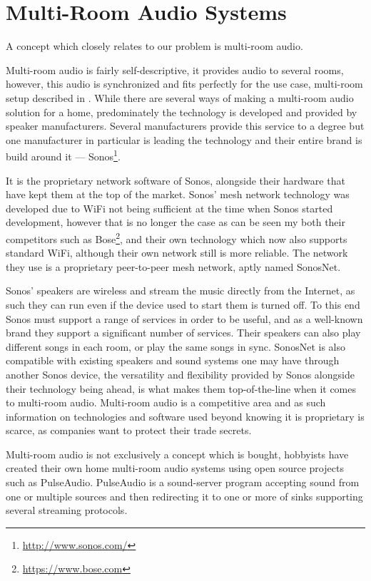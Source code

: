 \section{Multi-Room Audio Systems}
A concept which closely relates to our problem is multi-room audio.

Multi-room audio is fairly self-descriptive, it provides audio to several rooms, however, this audio is synchronized and fits perfectly for the use case, multi-room setup described in .
While there are several ways of making a multi-room audio solution for a home, predominately the technology is developed and provided by speaker manufacturers.
Several manufacturers provide this service to a degree but one
manufacturer in particular is leading the technology and their entire brand is build around it --- Sonos\footnote{\url{http://www.sonos.com/}}.

It is the proprietary network software of Sonos, alongside their hardware that have kept them at the top of the market.
Sonos' mesh network technology was developed due to WiFi not being sufficient
at the time when Sonos started development, however that is no longer the case as can be seen my both their competitors such as Bose\footnote{\url{https://www.bose.com}}, and their own technology which now also supports standard WiFi, although their own network still is more reliable.\cite{sonos1}
The network they use is a proprietary peer-to-peer mesh network, aptly named SonosNet.\cite{sonosWiki}

Sonos' speakers are wireless and stream the music directly from the Internet, as such they can run even if the device used to start them is turned off.
To this end Sonos must support a range of services in order to be useful, and as a well-known brand they support a significant number of services.
Their speakers can also play different songs in each room, or play the same songs in sync.
SonosNet is also compatible with existing speakers and sound systems one may have through another Sonos device, the versatility and flexibility provided by Sonos alongside their technology being ahead, is what makes them top-of-the-line when it comes to multi-room audio.\cite{sonos2}
Multi-room audio is a competitive area and as such information on technologies and software used beyond knowing it is proprietary is scarce, as companies want to protect their trade secrets.

Multi-room audio is not exclusively a concept which is bought, hobbyists have created their own home multi-room audio systems using open source projects such as PulseAudio.\cite{pulseAudioHobbyist}
PulseAudio is a sound-server program accepting sound from one or multiple sources and then redirecting it to one or more of sinks supporting several streaming protocols.\cite{pulseAudioModules}

